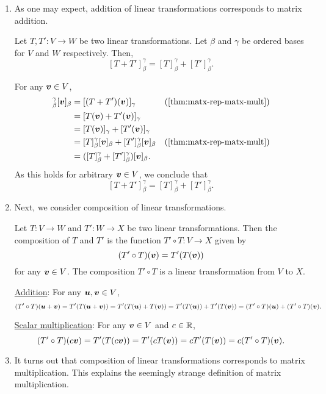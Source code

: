 \begin{enumerate}
\item As one may expect, addition of linear transformations corresponds to
matrix addition.
\begin{theorem}
\label{thm:lt-add-matx-add}
Let \(T,T':V\to W\) be two linear transformations. Let \(\beta\) and \(\gamma\)
be ordered bases for \(V\) and \(W\) respectively. Then,
\[
[T+T']_{\beta}^{\gamma}=[T]_{\beta}^{\gamma}+[T']_{\beta}^{\gamma}.
\]
\end{theorem}
\begin{pf}
For any \(\vb*{v}\in V\),
\begin{align*}
[T+T']_{\beta}^{\gamma}[\vect{v}]_{\beta}&=[(T+T')(\vect{v})]_{\gamma}&\text{(\Cref{thm:matx-rep-matx-mult})} \\
&=[T(\vect{v})+T'(\vect{v})]_{\gamma} \\
&=[T(\vect{v})]_{\gamma}+[T'(\vect{v})]_{\gamma} \\
&=[T]_{\beta}^{\gamma}[\vect{v}]_{\beta}
+[T']_{\beta}^{\gamma}[\vect{v}]_{\beta}&\text{(\Cref{thm:matx-rep-matx-mult})} \\
&=([T]_{\beta}^{\gamma}+[T']_{\beta}^{\gamma})[\vect{v}]_{\beta}.
\end{align*}
As this holds for arbitrary \(\vb*{v}\in V\), we conclude that
\[
[T+T']_{\beta}^{\gamma}=[T]_{\beta}^{\gamma}+[T']_{\beta}^{\gamma}.
\]
\end{pf}

\item Next, we consider composition of linear transformations.

Let \(T:V\to W\) and \(T':W\to X\) be two linear transformations. Then the
composition of \(T\) and \(T'\) is the function \(T'\circ T:V\to X\) given by
\[
(T'\circ T)(\vb*{v})=T'(T(\vb*{v}))
\]
for any \(\vb*{v}\in V\). The composition \(T'\circ T\) is a linear
transformation from \(V\) to \(X\).

\begin{pf}
\underline{Addition}: For any \(\vb*{u},\vb*{v}\in V\),
\[
(T'\circ T)(\vb*{u}+\vb*{v})
=T'(T(\vb*{u}+\vb*{v}))
=T'(T(\vb*{u})+T(\vb*{v}))
=T'(T(\vb*{u}))+T'(T(\vb*{v}))
=(T'\circ T)(\vb*{u})+(T'\circ T)(\vb*{v}).
\]

\underline{Scalar multiplication}: For any \(\vb*{v}\in V\) and \(c\in\mathbb{R}\),
\[
(T'\circ T)(c\vb*{v})
=T'(T(c\vb*{v}))
=T'(cT(\vb*{v}))
=cT'(T(\vb*{v}))
=c(T'\circ T)(\vb*{v}).
\]
\end{pf}

\item It turns out that composition of linear transformations corresponds to
matrix multiplication. This explains the seemingly strange definition of matrix
multiplication.


\end{enumerate}
